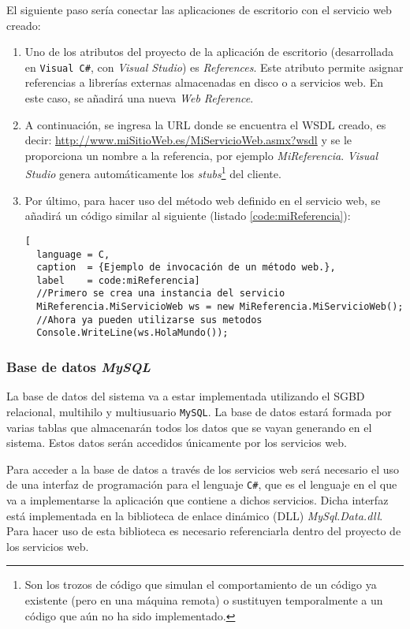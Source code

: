 El siguiente paso sería conectar las aplicaciones de escritorio con el
servicio web creado:
\begin{enumerate}
\item Uno de los atributos del proyecto de la aplicación de escritorio
(desarrollada en \texttt{Visual C\#}, con \emph{Visual Studio}) es
\emph{References}. Este atributo permite asignar referencias a librerías
externas almacenadas en disco o a servicios web. En este caso, se añadirá una
nueva \emph{Web Reference}.
\item A continuación, se ingresa la \acs{URL} donde se encuentra el \acs{WSDL}
creado, es decir: \url{http://www.miSitioWeb.es/MiServicioWeb.asmx?wsdl} y se
le proporciona un nombre a la referencia, por ejemplo \emph{MiReferencia}.
\emph{Visual Studio} genera automáticamente los \emph{stubs}\footnote{Son los
trozos de código que simulan el comportamiento de un código ya existente (pero
en una máquina remota) o sustituyen temporalmente a un código que aún no ha
sido implementado.} del cliente.
\item Por último, para hacer uso del método web definido en el servicio
web, se añadirá un código similar al siguiente (listado
\ref{code:miReferencia}):

\begin{lstlisting}[
  language = C,
  caption  = {Ejemplo de invocación de un método web.},
  label    = code:miReferencia]
  //Primero se crea una instancia del servicio
  MiReferencia.MiServicioWeb ws = new MiReferencia.MiServicioWeb();
  //Ahora ya pueden utilizarse sus metodos
  Console.WriteLine(ws.HolaMundo());
\end{lstlisting}

\end{enumerate}

    \subsubsection{Base de datos \emph{MySQL}}
La base de datos del sistema va a estar implementada utilizando el \acs{SGBD}
relacional, multihilo y multiusuario \texttt{MySQL}. La base de datos
estará formada por varias tablas que almacenarán todos los datos que se
vayan generando en el sistema. Estos datos serán accedidos únicamente por
los servicios web.

Para acceder a la base de datos a través de los servicios web será necesario
el uso de una interfaz de programación para el lenguaje \texttt{C\#}, que es
el lenguaje en el que va a implementarse la aplicación que contiene a dichos
servicios. Dicha interfaz está implementada en la biblioteca de enlace
dinámico (\acs{DLL}) \emph{MySql.Data.dll}. Para hacer uso de esta biblioteca
es necesario referenciarla dentro del proyecto de los servicios web.

